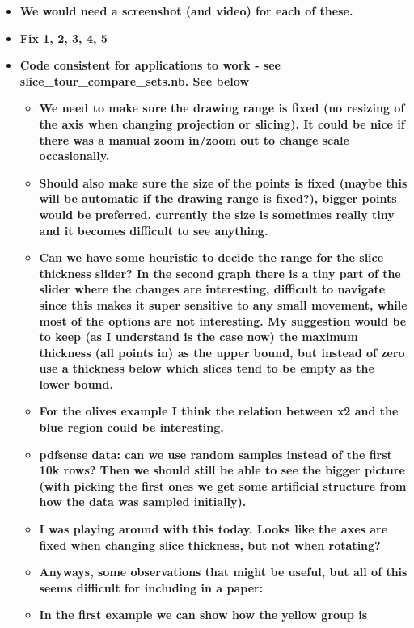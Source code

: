 \documentclass[]{interact}
\theoremstyle{plain}%
\theoremstyle{definition}
\theoremstyle{remark}
\providecommand{\tightlist}{%
  \setlength{\itemsep}{0pt}\setlength{\parskip}{0pt}}
\def\tightlist{}
\begin{document}
\begin{itemize}
\tightlist
\item
  \textbf{We would need a screenshot (and video) for each of these.}
\item
  \textbf{Fix 1, 2, 3, 4, 5}
\item
  \textbf{Code consistent for applications to work - see
  slice\_tour\_compare\_sets.nb. See below}

  \begin{itemize}
  \tightlist
  \item
    \textbf{We need to make sure the drawing range is fixed (no resizing
    of the axis when changing projection or slicing). It could be nice
    if there was a manual zoom in/zoom out to change scale
    occasionally.}
  \item
    \textbf{Should also make sure the size of the points is fixed (maybe
    this will be automatic if the drawing range is fixed?), bigger
    points would be preferred, currently the size is sometimes really
    tiny and it becomes difficult to see anything.}
  \item
    \textbf{Can we have some heuristic to decide the range for the slice
    thickness slider? In the second graph there is a tiny part of the
    slider where the changes are interesting, difficult to navigate
    since this makes it super sensitive to any small movement, while
    most of the options are not interesting. My suggestion would be to
    keep (as I understand is the case now) the maximum thickness (all
    points in) as the upper bound, but instead of zero use a thickness
    below which slices tend to be empty as the lower bound.}
  \item
    \textbf{For the olives example I think the relation between x2 and
    the blue region could be interesting.}
  \item
    \textbf{pdfsense data: can we use random samples instead of the
    first 10k rows? Then we should still be able to see the bigger
    picture (with picking the first ones we get some artificial
    structure from how the data was sampled initially).}
  \item
    \textbf{I was playing around with this today. Looks like the axes
    are fixed when changing slice thickness, but not when rotating?}
  \item
    \textbf{Anyways, some observations that might be useful, but all of
    this seems difficult for including in a paper:}
  \item
    \textbf{In the first example we can show how the yellow group is
}
\end{itemize}
\end{itemize}
\end{document}
